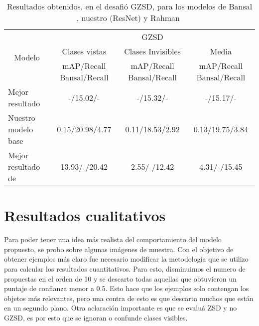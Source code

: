 \begin{table}[]
	\centering
	\resizebox{12.5cm}{1.2cm} {
	\begin{tabular}{|l|c|c|c|}
		\hline
		\multicolumn{1}{|c|}{\multirow{3}{*}{Modelo}} & \multicolumn{3}{c|}{GZSD}                                                       \\ \cline{2-4} 
		\multicolumn{1}{|c|}{}                        & Clases vistas             & Clases Invisibles        & Media                    \\ \cline{2-4} 
		\multicolumn{1}{|c|}{}                        & mAP/Recall Bansal/Recall  & mAP/Recall Bansal/Recall & mAP/Recall Bansal/Recall \\ \hline
		Mejor resultado \cite{bansal2018zero}                                        & -/15.02/-                 & -/15.32/-                & -/15.17/-                \\ \hline
		Nuestro modelo base                              & 0.15/20.98/4.77           & 0.11/18.53/2.92          & 0.13/19.75/3.84           \\ \hline
		Mejor resultado de \cite{rahman2020zero}     & 13.93/-/20.42             & 2.55/-/12.42             & 4.31/-/15.45             \\ \hline
	\end{tabular}
	}
	\caption{Resultados obtenidos, en el desafió GZSD, para los modelos de Bansal \etal~\cite{bansal2018zero}, nuestro (ResNet) y Rahman \etal~\cite{rahman2020zero}}
	\label{tab:resultados-gzsd}
\end{table}
\newpage

\section{Resultados cualitativos} \label{sec:resultadoscualitativos}

Para poder tener una idea más realista del comportamiento del modelo propuesto, se probo sobre algunas imágenes de muestra. Con el objetivo de obtener ejemplos más claro fue necesario modificar la metodología que se utilizo para calcular los resultados cuantitativos. Para esto, disminuimos el numero de propuestas en el orden de 10 y se descarto todas aquellas que obtuvieron un puntaje de confianza menor a 0.5. Esto hace que los ejemplos solo contengan los objetos más relevantes, pero una contra de esto es que descarta muchos que están en un segundo plano. Otra aclaración importante es que se evaluá ZSD y no GZSD, es por esto que se ignoran o confunde clases visibles. 

